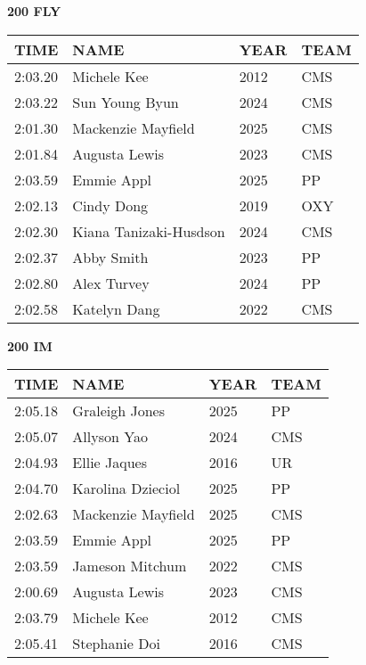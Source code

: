 \vspace{0.4cm}

\begin{minipage}[t]{0.48\textwidth}
\centering
\textbf{200 FLY}\\[0.05cm]
\begin{tabular}{@{}p{1.8cm}p{2.8cm}p{1.2cm}p{1.4cm}@{}}
\hline
\textbf{TIME} & \textbf{NAME} & \textbf{YEAR} & \textbf{TEAM} \\
\hline
2:03.20 & Michele Kee & 2012 & CMS \\
2:03.22 & Sun Young Byun & 2024 & CMS \\
2:01.30 & Mackenzie Mayfield & 2025 & CMS \\
2:01.84 & Augusta Lewis & 2023 & CMS \\
2:03.59 & Emmie Appl & 2025 & PP \\
2:02.13 & Cindy Dong & 2019 & OXY \\
2:02.30 & Kiana Tanizaki-Husdson & 2024 & CMS \\
2:02.37 & Abby Smith & 2023 & PP \\
2:02.80 & Alex Turvey & 2024 & PP \\
2:02.58 & Katelyn Dang & 2022 & CMS \\
\hline
\end{tabular}
\end{minipage}\hfill
\begin{minipage}[t]{0.48\textwidth}
\centering
\textbf{200 IM}\\[0.05cm]
\begin{tabular}{@{}p{1.8cm}p{2.8cm}p{1.2cm}p{1.4cm}@{}}
\hline
\textbf{TIME} & \textbf{NAME} & \textbf{YEAR} & \textbf{TEAM} \\
\hline
2:05.18 & Graleigh Jones & 2025 & PP \\
2:05.07 & Allyson Yao & 2024 & CMS \\
2:04.93 & Ellie Jaques & 2016 & UR \\
2:04.70 & Karolina Dzieciol & 2025 & PP \\
2:02.63 & Mackenzie Mayfield & 2025 & CMS \\
2:03.59 & Emmie Appl & 2025 & PP \\
2:03.59 & Jameson Mitchum & 2022 & CMS \\
2:00.69 & Augusta Lewis & 2023 & CMS \\
2:03.79 & Michele Kee & 2012 & CMS \\
2:05.41 & Stephanie Doi & 2016 & CMS \\
\hline
\end{tabular}
\end{minipage}

